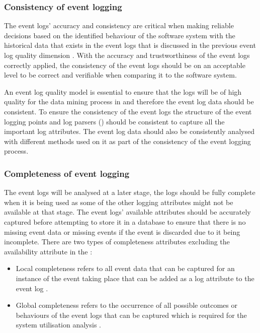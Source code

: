 \subsubsection{Consistency of event logging} 
The event logs' accuracy and consistency are critical when making reliable decisions based on the identified behaviour of the software system with the historical data that exists in the event logs that is discussed in the previous event log quality dimension \cite{Stojanov2017, Kherbouche2017}. With the accuracy and trustworthiness of the event logs correctly applied, the consistency of the event logs should be on an acceptable level to be correct and verifiable when comparing it to the software system. \par An event log quality model is essential to ensure that the logs will be of high quality for the data mining process in  and therefore the event log data should be consistent. To ensure the consistency of the event logs the structure of the event logging points and log parsers () should be consistent to capture all the important log attributes. The event log data should also be consistently analysed with different methods used on it as part of the consistency of the event logging process.

\subsubsection{Completeness of event logging} 
The event logs will be analysed at a later stage, the logs should be fully complete when it is being used as some of the other logging attributes might not be available at that stage. The event logs' available attributes should be accurately captured before attempting to store it in a database to ensure that there is no missing event data or missing events if the event is discarded due to it being incomplete. There are two types of completeness attributes excluding the availability attribute in the :

\begin{itemize}
	\item Local completeness refers to all event data that can be captured for an instance of the event taking place that can be added as a log attribute to the event log \cite{Kherbouche2017, VanDerAalst2004}.
	\item Global completeness refers to the occurrence of all possible outcomes or behaviours of the event logs that can be captured which is required for the system utilisation analysis \cite{Kherbouche2017, VanDerAalst2004}.
\end{itemize}

